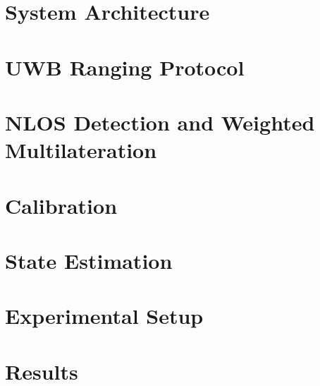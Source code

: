 \documentclass[letterpaper, 10pt, conference]{IEEEtran}
\begin{document}
\section{System Architecture}
\label{sec:architecture}


\section{UWB Ranging Protocol}
\label{sec:protocol}


\section{NLOS Detection and Weighted Multilateration}
\label{sec:nlos}


\section{Calibration}
\label{sec:calibration}


\section{State Estimation}
\label{sec:estimation}


\section{Experimental Setup}
\label{sec:setup}


\section{Results}
\label{sec:results}


\end{document}
